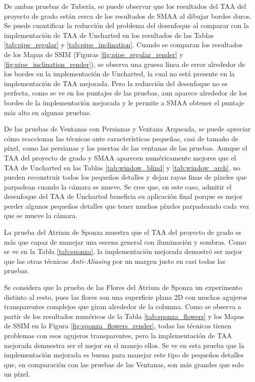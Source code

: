 \documentclass[pregrado]{tesis-usb} %
\begin{document}
De ambas pruebas de Tubería, se puede observar que los resultados del TAA del proyecto de grado están cerca de los resultados de SMAA al dibujar bordes duros. Se puede cuantificar la reducción del problema del desenfoque al comparar con la implementación de TAA de Uncharted en los resultados de las Tablas \ref{tab:pipe_regular} y \ref{tab:pipe_inclination}. Cuando se comparan los resultados de los Mapas de SSIM (Figuras \ref{fig:pipe_regular_render} y \ref{fig:pipe_inclination_render}), se observa una gruesa línea de error alrededor de los bordes en la implementación de Uncharted, la cual no está presente en la implementación de TAA mejorada. Pero la reducción del desenfoque no es perfecta, como se ve en los puntajes de las pruebas, aun aparece alrededor de los bordes de la implementación mejorada y le permite a SMAA obtener el puntaje más alto en algunas pruebas.

De las pruebas de Ventanas con Persianas y Ventana Arqueada, se puede apreciar cómo reaccionan las técnicas ante características pequeñas, casi de tamaño de píxel, como las persianas y las puertas de las ventanas de las pruebas. Aunque el TAA del proyecto de grado y SMAA aparecen numéricamente mejores que el TAA de Uncharted en las Tablas \ref{tab:window_blind} y \ref{tab:window_arch}, no pueden reconstruir todos los pequeños detalles y dejan rayas finas de píxeles que parpadean cuando la cámara se mueve. Se cree que, en este caso, admitir el desenfoque del TAA de Uncharted beneficia su aplicación final porque es mejor perder algunos pequeños detalles que tener muchos píxeles parpadeando cada vez que se mueve la cámara.

La prueba del Atrium de Sponza muestra que el TAA del proyecto de grado es más que capaz de manejar una escena general con iluminación y sombras. Como se ve en la Tabla \ref{tab:sponza}, la  implementación mejorada demostró ser mejor que las otras técnicas \textit{Anti-Aliasing} por un margen justo en casi todas las pruebas.

Se considera que la prueba de las Flores del Atrium de Sponza un experimento distinto al resto, pues las flores son una superficie plana 2D con muchos agujeros transparentes complejos que giran alrededor de la columna. Como se observa a partir de los resultados numéricos de la Tabla \ref{tab:sponza_flowers} y los Mapas de SSIM en la Figura \ref{fig:sponza_flowers_render}, todas las técnicas tienen problemas con esos agujeros transparentes, pero la implementación de TAA mejorada demuestra ser el mejor en el manejo ellos. Se ve en esta prueba que la implementación mejorada es buena para manejar este tipo de pequeños detalles que, en comparación con las pruebas de las Ventanas, son más grandes que solo un píxel. 
\end{document}
